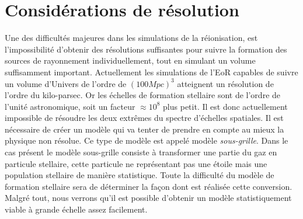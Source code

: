 \section{Considérations de résolution}

Une des difficultés majeures dans les simulations de la réionisation, est l'impossibilité d'obtenir des résolutions suffisantes pour suivre la formation des sources de rayonnement individuellement, tout en simulant un volume suffisamment important.
Actuellement les simulations de l'\ac{EoR} capables de suivre un volume d'Univers de l'ordre de $(100Mpc)^3$ atteignent un résolution de l'ordre du kilo-parsec.
Or les échelles de formation stellaire sont de l'ordre de l'unité astronomique, soit un facteur $\approx 10^8$ plus petit.
Il est donc actuellement impossible de résoudre les deux extrêmes du spectre d'échelles spatiales.
Il est nécessaire de créer un modèle qui va tenter de prendre en compte au mieux la physique non résolue.
Ce type de modèle est appelé modèle \textit{sous-grille}.
Dans le cas présent le modèle sous-grille consiste à transformer une partie du gaz en particule stellaire, cette particule ne représentant pas une étoile mais une population stellaire de manière statistique.
Toute la difficulté du modèle de formation stellaire sera de déterminer la façon dont est réalisée cette conversion.
Malgré tout, nous verrons qu'il est possible d'obtenir un modèle statistiquement viable à grande échelle assez facilement.



